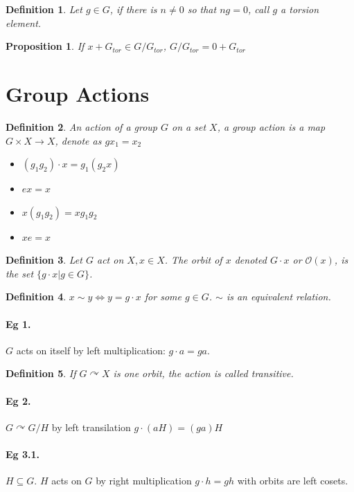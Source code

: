 \documentclass[12pt]{article}
\newtheorem{definition}{Definition}[subsection]
\newtheorem{proposition}{Proposition}[subsection]
\begin{document}
					\begin{definition}
						Let $g \in G$, if there is $n \neq 0$ so that $ng = 0$, call $g$ a torsion element. 
					\end{definition}
					
					\begin{proposition}
						If $x + G_{tor} \in G / G_{tor}$, $G / G_{tor} = 0 + G_{tor}$
					\end{proposition}
	\section{Group Actions}
		\begin{definition}
			An action of a group $G$ on a set $X$, a group action is a map $G \times X \rightarrow X$, denote as $gx_1 = x_2$
				\begin{itemize}
					\item $(g_1g_2)\cdot x = g_1(g_2x)$
					\item $ex = x$
					\item $x(g_1g_2) = xg_1g_2$
					\item $xe = x$
				\end{itemize}
		\end{definition}
		\begin{definition}
			Let $G$ act on $X, x \in X$. The orbit of $x$ denoted $G \cdot x$ or $\mathcal{O}(x)$, is the set $\{g \cdot x | g \in G\}$.
		\end{definition}
		
		\begin{definition}
			$x \sim y \Leftrightarrow y = g\cdot x$ for some $g \in G$. $\sim$ is an equivalent relation.
		\end{definition}
		\paragraph{Eg 1.} $G$ acts on itself by left multiplication: $g \cdot a = ga$.
		
		\begin{definition}
			If $G \curvearrowright X$ is one orbit, the action is called transitive.
		\end{definition}
		
		\paragraph{Eg 2.} $G \curvearrowright G / H$ by left transilation $g \cdot (aH) = (ga)H$
		
		\paragraph{Eg 3.1.} $H \subseteq G$. $H$ acts on $G$ by right multiplication $g \cdot h = gh$ with orbits are left cosets.
		
\end{document}
